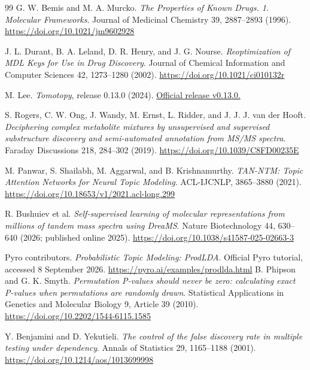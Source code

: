 \begin{thebibliography}{99}
G. W. Bemis and M. A. Murcko. \emph{The Properties of Known Drugs. 1.
Molecular Frameworks}. Journal of Medicinal Chemistry 39, 2887--2893 (1996).
\url{https://doi.org/10.1021/jm9602928}

J. L. Durant, B. A. Leland, D. R. Henry, and J. G. Nourse.
\emph{Reoptimization of MDL Keys for Use in Drug Discovery}.
Journal of Chemical Information and Computer Sciences 42, 1273--1280 (2002).
\url{https://doi.org/10.1021/ci010132r}

M. Lee. \emph{Tomotopy}, release 0.13.0 (2024).
\href{https://github.com/bab2min/tomotopy/releases/tag/v0.13.0}{Official release v0.13.0.}

S. Rogers, C. W. Ong, J. Wandy, M. Ernst, L. Ridder, and J. J. J. van der Hooft.
\emph{Deciphering complex metabolite mixtures by unsupervised and supervised
substructure discovery and semi-automated annotation from MS/MS spectra}.
Faraday Discussions 218, 284--302 (2019).
\url{https://doi.org/10.1039/C8FD00235E}

M. Panwar, S. Shailabh, M. Aggarwal, and B. Krishnamurthy.
\emph{TAN-NTM: Topic Attention Networks for Neural Topic Modeling}.
ACL-IJCNLP, 3865--3880 (2021).
\url{https://doi.org/10.18653/v1/2021.acl-long.299}

R. Bushuiev et al. \emph{Self-supervised learning of molecular representations
from millions of tandem mass spectra using DreaMS}.
Nature Biotechnology 44, 630--640 (2026; published online 2025).
\url{https://doi.org/10.1038/s41587-025-02663-3}

Pyro contributors. \emph{Probabilistic Topic Modeling: ProdLDA}.
Official Pyro tutorial, accessed 8 September 2026.
\url{https://pyro.ai/examples/prodlda.html}
B. Phipson and G. K. Smyth. \emph{Permutation P-values should never be zero:
calculating exact P-values when permutations are randomly drawn}.
Statistical Applications in Genetics and Molecular Biology 9, Article 39 (2010).
\url{https://doi.org/10.2202/1544-6115.1585}

Y. Benjamini and D. Yekutieli. \emph{The control of the false discovery rate
in multiple testing under dependency}. Annals of Statistics 29,
1165--1188 (2001).
\url{https://doi.org/10.1214/aos/1013699998}
\end{thebibliography}
